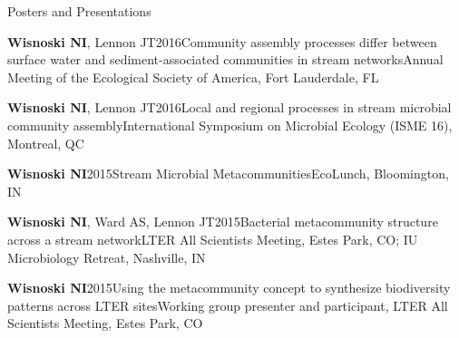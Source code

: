 \documentclass{resume} %
\begin{document}
\begin{rSection}{Posters and Presentations}

  \begin{Publication}{{\bf Wisnoski NI}, Lennon JT}{2016}{Community assembly processes differ between surface water and sediment-associated communities in stream networks}{Annual Meeting of the Ecological Society of America, Fort Lauderdale, FL}
  \end{Publication}

  \begin{Publication}{{\bf Wisnoski NI}, Lennon JT}{2016}{Local and regional processes in stream microbial community assembly}{International Symposium on Microbial Ecology (ISME 16), Montreal, QC}
  \end{Publication}

  \begin{Publication}{\bf Wisnoski NI}{2015}{Stream Microbial Metacommunities}{EcoLunch, Bloomington, IN}
  \end{Publication}

  \begin{Publication}{{\bf Wisnoski NI}, Ward AS, Lennon JT}{2015}{Bacterial metacommunity structure across a stream network}{LTER All Scientists Meeting, Estes Park, CO;  IU Microbiology Retreat, Nashville, IN}
  \end{Publication}

  \begin{Publication}{\bf Wisnoski NI}{2015}{Using the metacommunity concept to synthesize biodiversity patterns across LTER sites}{Working group presenter and participant, LTER All Scientists Meeting, Estes Park, CO}

  \end{Publication}


\end{rSection}
\end{document}
